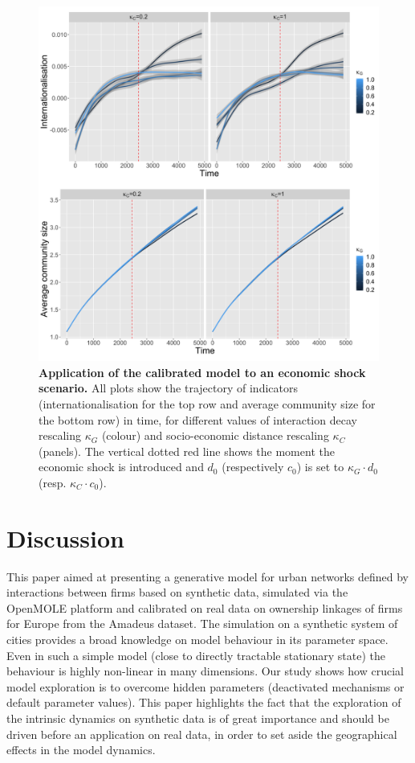 \documentclass[10pt,letterpaper]{article}
\begin{document}
\begin{figure}
	\begin{center}
    \includegraphics[width=\linewidth]{figures/Fig9.png}
    \end{center}
	\caption{\textbf{Application of the calibrated model to an economic shock scenario.} All plots show the trajectory of indicators (internationalisation for the top row and average community size for the bottom row) in time, for different values of interaction decay rescaling $\kappa_G$ (colour) and socio-economic distance rescaling $\kappa_C$ (panels). The vertical dotted red line shows the moment the economic shock is introduced and $d_0$ (respectively $c_0$) is set to $\kappa_G \cdot d_0$ (resp. $\kappa_C \cdot c_0$).\label{fig:fig9}}
\end{figure}



\section*{Discussion}

This paper aimed at presenting a generative model for urban networks defined by interactions between firms based on synthetic data, simulated via the OpenMOLE platform and calibrated on real data on ownership linkages of firms for Europe from the Amadeus dataset. The simulation on a synthetic system of cities provides a broad knowledge on model behaviour in its parameter space. Even in such a simple model (close to directly tractable stationary state) the behaviour is highly non-linear in many dimensions. Our study shows how crucial model exploration is to overcome hidden parameters (deactivated mechanisms or default parameter values). This paper highlights the fact that the exploration of the intrinsic dynamics on synthetic data is of great importance and should be driven before an application on real data, in order to set aside the geographical effects in the model dynamics.
\end{document}
